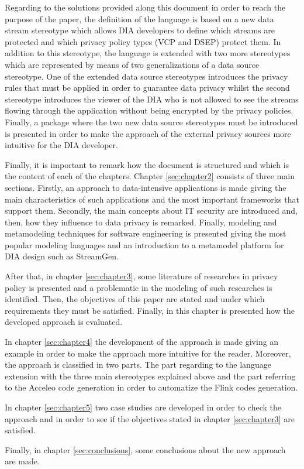 Regarding to the solutions provided along this document in order to reach the purpose of the paper, the definition of the language is based on a new data stream stereotype which allows DIA developers to define which streams are protected and which privacy policy types (VCP and DSEP) protect them. In addition to this stereotype, the language is extended with two more stereotypes which are represented by means of two generalizations of a data source stereotype. One of the extended data source stereotypes introduces the privacy rules that must be applied in order to guarantee data privacy whilst the second stereotype introduces the viewer of the DIA who is not allowed to see the streams flowing through the application without being encrypted by the privacy policies. Finally, a package where the two new data source stereotypes must be introduced is presented in order to make the approach of the external privacy sources more intuitive for the DIA developer.

Finally, it is important to remark how the document is structured and which is the content of each of the chapters. Chapter \ref{sec:chapter2} consists of three main sections. Firstly, an approach to data-intensive applications is made giving the main characteristics of such applications and the most important frameworks that support them. Secondly, the main concepts about IT security are introduced and, then, how they influence to data privacy is remarked. Finally, modeling and metamodeling techniques for software engineering is presented giving the most popular modeling languages and an introduction to a metamodel platform for DIA design such as StreamGen.

After that, in chapter \ref{sec:chapter3}, some literature of researches in privacy policy is presented and a problematic in the modeling of such researches is identified. Then, the objectives of this paper are stated and under which requirements they must be satisfied. Finally, in this chapter is presented how the developed approach is evaluated.

In chapter \ref{sec:chapter4} the development of the approach is made giving an example in order to make the approach more intuitive for the reader. Moreover, the approach is classified in two parts. The part regarding to the language extension with the three main stereotypes explained above and the part referring to the Acceleo code generation in order to automatize the Flink codes generation.

In chapter \ref{sec:chapter5} two case studies are developed in order to check the approach and in order to see if the objectives stated in chapter \ref{sec:chapter3} are satisfied.

Finally, in chapter \ref{sec:conclusions}, some conclusions about the new approach are made.
